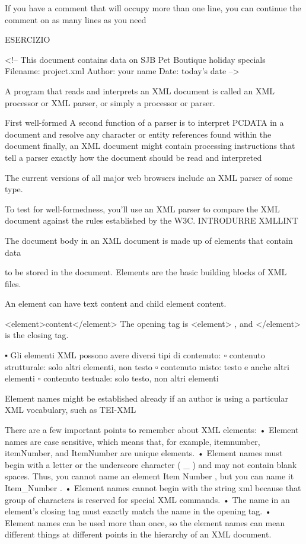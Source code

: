 If you have a comment that will occupy more than one line, you can
continue the ­comment on as many lines as you need


ESERCIZIO

<!--
This document contains data on SJB Pet Boutique
holiday specials
Filename: project.xml
Author:
your name
Date:
today's date
-->


A program that reads and interprets an XML document is called an XML processor or XML parser, or simply a processor or parser.

First well-formed
A second function of a parser is to interpret PCDATA in a document and resolve any character or
entity references found within the document
finally, an XML document might contain
processing instructions that tell a parser exactly how the document should be read and
interpreted

The current versions of all major web browsers include an XML parser of some type.

To test for well-formedness, you’ll use an XML parser to compare the XML document against the
rules established by the W3C.
INTRODURRE XMLLINT


The document body in an XML document is made up of elements that contain data

to be stored in the document. Elements are the basic building blocks of XML files.

An ­element can have text content and child element content.

<element>content</element>
The opening tag is <element> , and </element> is the closing
tag.

▪ Gli elementi XML possono avere diversi tipi di contenuto:
▫ contenuto strutturale: solo altri elementi, non testo
▫ contenuto misto: testo e anche altri elementi
▫ contenuto testuale: solo testo, non altri elementi

Element names might be established already if an author is using a particular XML
vocabulary, such as TEI-XML


There are a few important points to remember about XML elements:
• Element names are case sensitive, which means that, for example, itemnumber,
itemNumber, and ItemNumber are unique elements.
• Element names must begin with a letter or the underscore character ( _ ) and may not
contain blank spaces. Thus, you cannot name an element Item Number , but you can
name it Item_Number .
• Element names cannot begin with the string xml because that group of ­characters is
reserved for special XML commands.
• The name in an element’s closing tag must exactly match the name in the ­opening tag.
• Element names can be used more than once, so the element names can mean
different things at different points in the hierarchy of an XML document.

